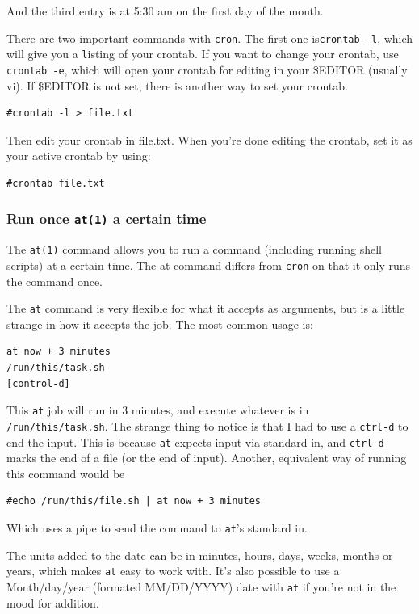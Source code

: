 And the third entry is at 5:30 am on the first day of the month. 

There are two important commands with {\tt cron}. The first one is{\tt crontab -l},
which will give you a {\tt l}isting of your crontab.  If you want to change your 
crontab, use {\tt crontab -e}, which will open your crontab for editing in your 
\$EDITOR (usually vi). If \$EDITOR is not set, there is another way to set your crontab.

\begin{verbatim}
#crontab -l > file.txt
\end{verbatim}

Then edit your crontab in file.txt. When you're done editing the crontab, set it as
your active crontab by using:

\begin{verbatim}
#crontab file.txt
\end{verbatim}


\subsubsection{Run once {\tt at(1)} a certain time}

The {\tt at(1)} command allows you to run a command (including running shell scripts) 
at a certain time. The at command differs from {\tt cron} on that it only 
runs the command once.

The {\tt at} command is very flexible for what it accepts as arguments,
but is a little strange in how it accepts the job. The most
common usage is:

\begin{verbatim}
at now + 3 minutes 
/run/this/task.sh    
[control-d]
\end{verbatim}

This  {\tt at} job will run in 3 minutes, and execute whatever is
in {\tt /run/this/task.sh}. The strange thing to notice is that I 
had to use a {\tt ctrl-d} to end the input. This is because 
{\tt at} expects input via standard in, and {\tt ctrl-d} marks the 
end of a file (or the end of input). Another, equivalent way of running this command would be

\begin{verbatim}
#echo /run/this/file.sh | at now + 3 minutes
\end{verbatim}

Which uses a pipe to send the command to {\tt at}'s standard in.

The units added to the date can be in minutes,
hours, days, weeks, months or years, which makes {\tt at} easy to work with. It's also 
possible to use a Month/day/year (formated MM/DD/YYYY) date with {\tt at} if you're not in 
the mood for addition.

